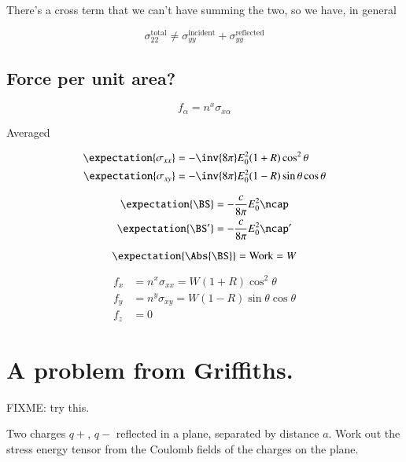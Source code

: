 There's a cross term that we can't have summing the two, so we have, in general

\begin{equation}\label{eqn:relativisticElectrodynamicsT9:660}
\sigma_{2 2}^{\text{total}} \ne 
\sigma_{y y}^{\text{incident}} 
+\sigma_{y y}^{\text{reflected}} 
\end{equation}

\subsection{Force per unit area?}

\begin{equation}\label{eqn:relativisticElectrodynamicsT9:230}
f_\alpha = n^x \sigma_{x \alpha} 
\end{equation}

Averaged

\begin{align}\label{eqn:relativisticElectrodynamicsT9:250}
\expectation{\sigma_{xx}} &= -\inv{8 \pi} E_0^2 ( 1 + R) \cos^2\theta \\
\expectation{\sigma_{xy}} &= -\inv{8 \pi} E_0^2 ( 1 - R) \sin\theta \cos\theta
\end{align}

\begin{align}\label{eqn:relativisticElectrodynamicsT9:270}
\expectation{\BS} &= -\frac{c}{8 \pi} E_0^2 \ncap \\
\expectation{\BS'} &= -\frac{c}{8 \pi} E_0^2 \ncap'
\end{align}

\begin{equation}\label{eqn:relativisticElectrodynamicsT9:290}
\expectation{\Abs{\BS}} = \text{Work} = W
\end{equation}

\begin{align}\label{eqn:relativisticElectrodynamicsT9:310}
f_x &= n^x \sigma_{x x} = W (1 + R) \cos^2\theta \\
f_y &= n^y \sigma_{x y} = W (1 - R) \sin\theta \cos\theta \\
f_z &= 0
\end{align}

\section{A problem from Griffiths.}

FIXME: try this.

Two charges $q+$, $q-$ reflected in a plane, separated by distance $a$.  Work out the stress energy tensor from the Coulomb fields of the charges on the plane.


